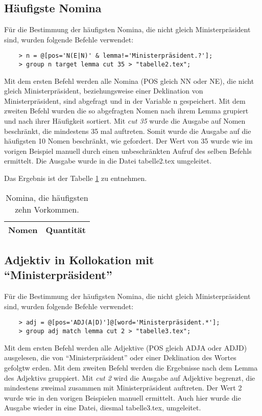 \documentclass[%
	type=document,%
  	style=article,%
  	media=print,
  	pages=oneside,%
  	prefixLecturer=Dozenten:,
  	author=multiple,
]{unihildesheim}
\begin{document}
\subsection{Häufigste Nomina}
Für die Bestimmung der häufigsten Nomina, die nicht gleich Ministerpräsident
sind, wurden folgende Befehle verwendet:
\begin{verbatim}
	> n = @[pos='N(E|N)' & lemma!='Ministerpräsident.?'];
	> group n target lemma cut 35 > "tabelle2.tex";
\end{verbatim}

Mit dem ersten Befehl werden alle Nomina (POS gleich NN oder NE), die nicht
gleich Ministerpräsident, beziehungsweise einer Deklination von
Ministerpräsident, sind abgefragt und in der Variable n gespeichert. Mit dem
zweiten Befehl wurden die so abgefragten Nomen nach ihrem Lemma grupiert und
nach ihrer Häufigkeit sortiert. Mit \textit{cut 35} wurde die Ausgabe auf Nomen
beschränkt, die mindestens 35 mal auftreten. Somit wurde die Ausgabe auf die
häufigsten 10 Nomen beschränkt, wie gefordert. Der Wert von 35 wurde wie im
vorigen Beispiel manuell durch einen unbeschränkten Aufruf des selben
Befehls ermittelt. Die Ausgabe wurde in die Datei tabelle2.tex umgeleitet. 

Das Ergebnis ist der Tabelle \ref{tab:nomina} zu entnehmen.
\begin{table}[htpb]\label{t}
	\center
	\begin{tabularx}{0.35\textwidth}{lr}
		\toprule
		\textbf{Nomen} & \textbf{Quantität}\\
		\midrule
		
		\bottomrule
	\end{tabularx}
	\caption{Nomina, die häufigsten zehn Vorkommen.}
	\label{tab:nomina}
\end{table}

\subsection{Adjektiv in Kollokation mit "`Ministerpräsident"'}
Für die Bestimmung der häufigsten Nomina, die nicht gleich Ministerpräsident
sind, wurden folgende Befehle verwendet:
\begin{verbatim}
	> adj = @[pos='ADJ(A|D)']@[word='Ministerpräsident.*'];
	> group adj match lemma cut 2 > "tabelle3.tex";
\end{verbatim}
Mit dem ersten Befehl werden alle Adjektive (POS gleich ADJA oder ADJD)
ausgelesen, die von "`Ministerpräsident"' oder einer Deklination des Wortes
gefolgtw erden. Mit dem zweiten Befehl werden die Ergebnisse nach dem Lemma des
Adjektivs gruppiert. Mit \textit{cut 2} wird die Ausgabe auf Adjektive begrenzt, die
mindestens zweimal zusammen mit Ministerpräsident auftreten. Der Wert 2 wurde
wie in den vorigen Beispielen manuell ermittelt. Auch hier wurde die Ausgabe
wieder in eine Datei, diesmal tabelle3.tex, umgeleitet. 
\end{document}
